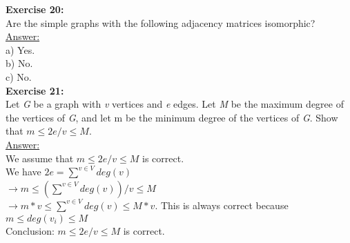 \documentclass[10pt]{article}
\renewcommand{\implies}{\rightarrow}
\begin{document}
	\textbf{Exercise 20:}\\
Are the simple graphs with the following adjacency matrices isomorphic?\\
\underline{Answer:}\\
a) Yes.\\
b) No.\\
c) No.\\

	\textbf{Exercise 21:}\\
Let \textit{G} be a graph with \textit{v} vertices and \textit{e} edges. Let \textit{M}  be the maximum degree of the vertices of \textit{G}, and let m be the minimum degree of the vertices of \textit{G}. Show that $m \leq 2\textit{e}/\textit{v} \leq \textit{M}.$\\
\underline{Answer:}\\
We assume that $m \leq 2\textit{e}/\textit{v} \leq \textit{M}$ is correct.\\
We have $2e = \displaystyle\sum_{}^{v \in V} deg(v)$\\
$\implies m \leq (\displaystyle\sum_{}^{v \in V} deg(v))/v \leq M$\\
$\implies m*v \leq \displaystyle\sum_{}^{v \in V} deg(v) \leq M*v$. This is always correct because $ m \leq deg(v_{i}) \leq M$\\
Conclusion: $m \leq 2\textit{e}/\textit{v} \leq \textit{M}$ is correct.\\
\end{document}
